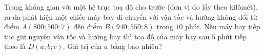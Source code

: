 \begin{ex}%
	Trong không gian với một hệ trục toạ độ cho trước (đơn vị đo lấy theo kilômét), ra-đa phát hiện một chiếc máy bay di chuyển với vận tốc và hướng không đổi từ điểm $A(800;500;7)$ đến điểm $B(940;550;8)$ trong $10$ phút. Nếu máy bay tiếp tục giữ nguyên vận tốc và hướng bay thì toạ độ của máy bay sau $5$ phút tiếp theo là $D(a;b;c)$. Giá trị của $a$ bằng bao nhiêu?
	\begin{center}
	\end{center}
\end{ex}

